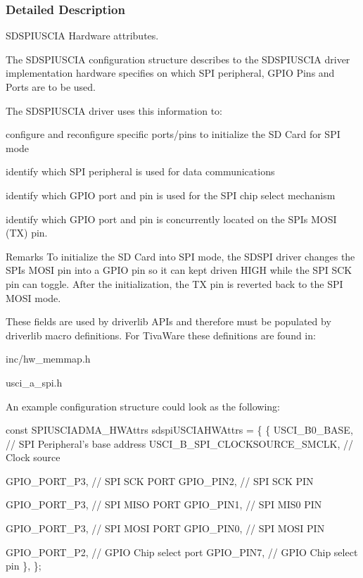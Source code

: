 \subsubsection{Detailed Description}
S\+D\+S\+P\+I\+U\+S\+C\+I\+A Hardware attributes. 

The S\+D\+S\+P\+I\+U\+S\+C\+I\+A configuration structure describes to the S\+D\+S\+P\+I\+U\+S\+C\+I\+A driver implementation hardware specifies on which S\+P\+I peripheral, G\+P\+I\+O Pins and Ports are to be used.

The S\+D\+S\+P\+I\+U\+S\+C\+I\+A driver uses this information to\+:
\begin{DoxyItemize}
\item configure and reconfigure specific ports/pins to initialize the S\+D Card for S\+P\+I mode
\item identify which S\+P\+I peripheral is used for data communications
\item identify which G\+P\+I\+O port and pin is used for the S\+P\+I chip select mechanism
\item identify which G\+P\+I\+O port and pin is concurrently located on the S\+P\+I\textquotesingle{}s M\+O\+S\+I (T\+X) pin.
\end{DoxyItemize}

\begin{DoxyRemark}{Remarks}
To initialize the S\+D Card into S\+P\+I mode, the S\+D\+S\+P\+I driver changes the S\+P\+I\textquotesingle{}s M\+O\+S\+I pin into a G\+P\+I\+O pin so it can kept driven H\+I\+G\+H while the S\+P\+I S\+C\+K pin can toggle. After the initialization, the T\+X pin is reverted back to the S\+P\+I M\+O\+S\+I mode.
\end{DoxyRemark}
These fields are used by driverlib A\+P\+Is and therefore must be populated by driverlib macro definitions. For Tiva\+Ware these definitions are found in\+:
\begin{DoxyItemize}
\item inc/hw\+\_\+memmap.\+h
\item usci\+\_\+a\+\_\+spi.\+h
\end{DoxyItemize}

An example configuration structure could look as the following\+: 
\begin{DoxyCode}
\textcolor{keyword}{const} SPIUSCIADMA_HWAttrs sdspiUSCIAHWAttrs = \{
    \{
         USCI\_B0\_BASE, \textcolor{comment}{// SPI Peripheral's base address}
         USCI\_B\_SPI\_CLOCKSOURCE\_SMCLK, \textcolor{comment}{// Clock source}

         GPIO\_PORT\_P3,  \textcolor{comment}{// SPI SCK PORT}
         GPIO\_PIN2,     \textcolor{comment}{// SPI SCK PIN}

         GPIO\_PORT\_P3,  \textcolor{comment}{// SPI MISO PORT}
         GPIO\_PIN1,     \textcolor{comment}{// SPI MIS0 PIN}

         GPIO\_PORT\_P3,  \textcolor{comment}{// SPI MOSI PORT}
         GPIO\_PIN0,     \textcolor{comment}{// SPI MOSI PIN}

         GPIO\_PORT\_P2,  \textcolor{comment}{// GPIO Chip select port}
         GPIO\_PIN7,     \textcolor{comment}{// GPIO Chip select pin}
     \},
\};
\end{DoxyCode}
 


